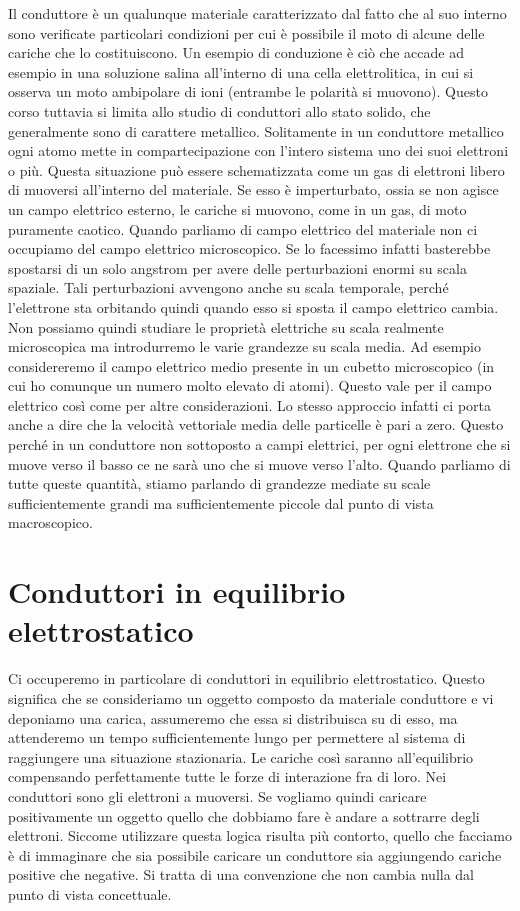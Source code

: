 Il conduttore è un qualunque materiale caratterizzato dal fatto che al suo interno sono verificate particolari condizioni per cui è possibile il moto di alcune delle cariche che lo costituiscono. Un esempio di conduzione è ciò che accade ad esempio in una soluzione salina all'interno di una cella elettrolitica, in cui si osserva un moto ambipolare di ioni (entrambe le polarità si muovono). Questo corso tuttavia si limita allo studio di conduttori allo stato solido, che generalmente sono di carattere metallico. Solitamente in un conduttore metallico ogni atomo mette in compartecipazione con l'intero sistema uno dei suoi elettroni o più. Questa situazione può essere schematizzata come un gas di elettroni libero di muoversi all'interno del materiale. Se esso è imperturbato, ossia se non agisce un campo elettrico esterno, le cariche si muovono, come in un gas, di moto puramente caotico. Quando parliamo di campo elettrico del materiale non ci occupiamo del campo elettrico microscopico. Se lo facessimo infatti basterebbe spostarsi di un solo angstrom per avere delle perturbazioni enormi su scala spaziale. Tali perturbazioni avvengono anche su scala temporale, perché l'elettrone sta orbitando quindi quando esso si sposta il campo elettrico cambia. Non possiamo quindi studiare le proprietà elettriche su scala realmente microscopica ma introdurremo le varie grandezze su scala media. Ad esempio considereremo il campo elettrico medio presente in un cubetto microscopico (in cui ho comunque un numero molto elevato di atomi). Questo vale per il campo elettrico così come per altre considerazioni. Lo stesso approccio infatti ci porta anche a dire che la velocità vettoriale media delle particelle è pari a zero. Questo perché in un conduttore non sottoposto a campi elettrici, per ogni elettrone che si muove verso il basso ce ne sarà uno che si muove verso l'alto. Quando parliamo di tutte queste quantità, stiamo parlando di grandezze mediate su scale sufficientemente grandi ma sufficientemente piccole dal punto di vista macroscopico.

\section{Conduttori in equilibrio elettrostatico}

Ci occuperemo in particolare di conduttori in equilibrio elettrostatico. Questo significa che se consideriamo un oggetto composto da materiale conduttore e vi deponiamo una carica, assumeremo che essa si distribuisca su di esso, ma attenderemo un tempo sufficientemente lungo per permettere al sistema di raggiungere una situazione stazionaria. Le cariche così saranno all'equilibrio compensando perfettamente tutte le forze di interazione fra di loro.
Nei conduttori sono gli elettroni a muoversi. Se vogliamo quindi caricare positivamente un oggetto quello che dobbiamo fare è andare a sottrarre degli elettroni. Siccome utilizzare questa logica risulta più contorto, quello che facciamo è di immaginare che sia possibile caricare un conduttore sia aggiungendo cariche positive che negative. Si tratta di una convenzione che non cambia nulla dal punto di vista concettuale.

